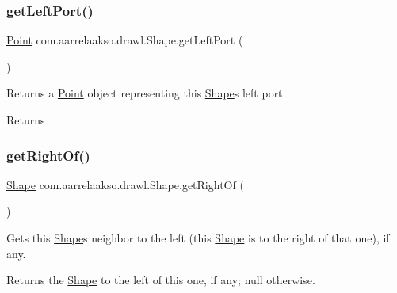 \subsubsection{\texorpdfstring{get\+Left\+Port()}{getLeftPort()}}
{\footnotesize\ttfamily \hyperlink{classcom_1_1aarrelaakso_1_1drawl_1_1_point}{Point} com.\+aarrelaakso.\+drawl.\+Shape.\+get\+Left\+Port (\begin{DoxyParamCaption}{ }\end{DoxyParamCaption})}



Returns a \hyperlink{classcom_1_1aarrelaakso_1_1drawl_1_1_point}{Point} object representing this \hyperlink{classcom_1_1aarrelaakso_1_1drawl_1_1_shape}{Shape}\textquotesingle{}s left port. 

\begin{DoxyReturn}{Returns}

\end{DoxyReturn}
\mbox{\label{classcom_1_1aarrelaakso_1_1drawl_1_1_shape_a1ad573b06f341aa79f6a255a476ae6e4}} 
\subsubsection{\texorpdfstring{get\+Right\+Of()}{getRightOf()}}
{\footnotesize\ttfamily \hyperlink{classcom_1_1aarrelaakso_1_1drawl_1_1_shape}{Shape} com.\+aarrelaakso.\+drawl.\+Shape.\+get\+Right\+Of (\begin{DoxyParamCaption}{ }\end{DoxyParamCaption})}



Gets this \hyperlink{classcom_1_1aarrelaakso_1_1drawl_1_1_shape}{Shape}\textquotesingle{}s neighbor to the left (this \hyperlink{classcom_1_1aarrelaakso_1_1drawl_1_1_shape}{Shape} is to the right of that one), if any. 

\begin{DoxyReturn}{Returns}
the \hyperlink{classcom_1_1aarrelaakso_1_1drawl_1_1_shape}{Shape} to the left of this one, if any; {\ttfamily null} otherwise. 
\end{DoxyReturn}
\mbox{\label{classcom_1_1aarrelaakso_1_1drawl_1_1_shape_a319c78d425ec91e1aef1072a95e349ad}} 
